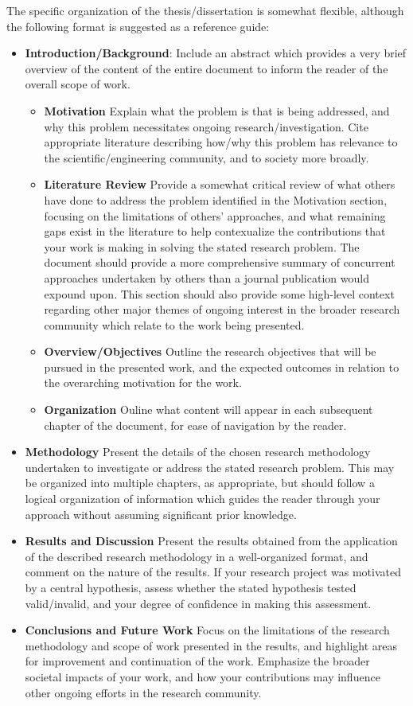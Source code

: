 \documentclass[12pt,a4paper,article,oneside]{memoir} %
\begin{document}
The specific organization of the thesis/dissertation is somewhat flexible, although the following format is suggested as a reference guide:
\begin{itemize}
\item \textbf{Introduction/Background}: Include an abstract which provides a very brief overview of the content of the entire document to inform the reader of the overall scope of work.
\begin{itemize}
\item \textbf{Motivation} Explain what the problem is that is being addressed, and why this problem necessitates ongoing research/investigation. Cite appropriate literature describing how/why this problem has relevance to the scientific/engineering community, and to society more broadly.
\item \textbf{Literature Review} Provide a somewhat critical review of what others have done to address the problem identified in the Motivation section, focusing on the limitations of others' approaches, and what remaining gaps exist in the literature to help contexualize the contributions that your work is making in solving the stated research problem. The document should provide a more comprehensive summary of concurrent approaches undertaken by others than a journal publication would expound upon. This section should also provide some high-level context regarding other major themes of ongoing interest in the broader research community which relate to the work being presented.
\item \textbf{Overview/Objectives} Outline the research objectives that will be pursued in the presented work, and the expected outcomes in relation to the overarching motivation for the work.
\item \textbf{Organization} Ouline what content will appear in each subsequent chapter of the document, for ease of navigation by the reader.
\end{itemize}
\item \textbf{Methodology} Present the details of the chosen research methodology undertaken to investigate or address the stated research problem. This may be organized into multiple chapters, as appropriate, but should follow a logical organization of information which guides the reader through your approach without assuming significant prior knowledge.
\item \textbf{Results and Discussion} 	Present the results obtained from the application of the described research methodology in a well-organized format, and comment on the nature of the results. If your research project was motivated by a central hypothesis, assess whether the stated hypothesis tested valid/invalid, and your degree of confidence in making this assessment.
\item \textbf{Conclusions and Future Work} Focus on the limitations of the research methodology and scope of work presented in the results, and highlight areas for improvement and continuation of the work. Emphasize the broader societal impacts of your work, and how your contributions may influence other ongoing efforts in the research community.
\end{itemize}
\end{document}
